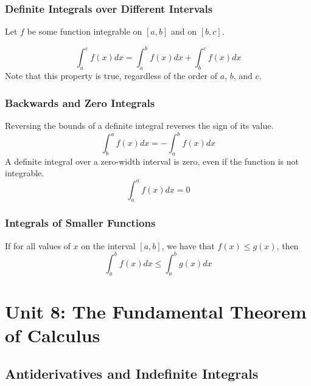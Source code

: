 \documentclass[10pt]{article}
\begin{document}
\subsubsection{Definite Integrals over Different Intervals}
Let $f$ be some function integrable on $[a,b]$ and on $[b,c]$.
\begin{center}
\end{center}
$$
    \int_a^cf(x)dx=\int_a^bf(x)dx+\int_b^cf(x)dx
$$
Note that this property is true, regardless of the order of $a$, $b$, and $c$.
\subsubsection{Backwards and Zero Integrals}
Reversing the bounds of a definite integral reverses the sign of its value.
$$
    \int_b^a f(x)dx = -\int_a^b f(x)dx
$$
A definite integral over a zero-width interval is zero, even if the function is not integrable.
$$
    \int_a^a f(x)dx=0
$$
\subsubsection{Integrals of Smaller Functions}
If for all values of $x$ on the interval $[a,b]$, we have that $f(x)\leq g(x)$, then
$$
    \int_a^b f(x)dx \leq \int_a^b g(x)dx
$$
\section{Unit 8: The Fundamental Theorem of Calculus}
\subsection{Antiderivatives and Indefinite Integrals}
\end{document}
